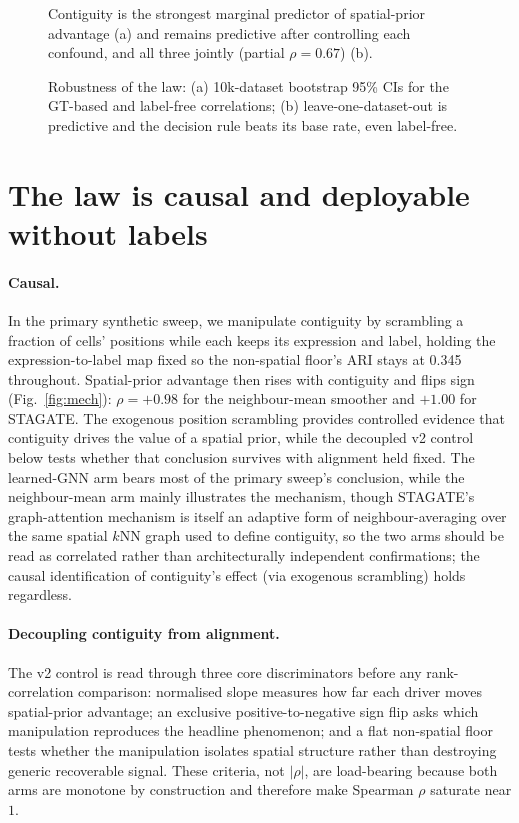 \documentclass[journal]{IEEEtran}
\begin{document}
\begin{figure}[!t]\centering
\resizebox{\linewidth}{!}{}
\caption{Contiguity is the strongest marginal predictor of spatial-prior advantage (a) and remains
predictive after controlling each confound, and all three jointly (partial $\rho=0.67$) (b).}
\label{fig:confound}
\end{figure}

\begin{figure}[!t]\centering
\resizebox{\linewidth}{!}{}
\caption{Robustness of the law: (a) 10k-dataset bootstrap 95\% CIs for the GT-based and label-free
correlations; (b) leave-one-dataset-out is predictive and the decision rule beats its base rate, even
label-free.}
\label{fig:robust}
\end{figure}

\section{The law is causal and deployable without labels}\label{sec:causal}
\paragraph{Causal.} In the primary synthetic sweep, we manipulate contiguity by scrambling a fraction of cells'
positions while each keeps its expression and label, holding the expression-to-label map fixed so the
non-spatial floor's ARI stays at 0.345 throughout. Spatial-prior advantage then rises with contiguity and
flips sign (Fig.~\ref{fig:mech}): $\rho=+0.98$ for the neighbour-mean smoother and $+1.00$ for STAGATE.
The exogenous position scrambling provides controlled evidence that contiguity drives the value
of a spatial prior, while the decoupled v2 control below tests whether that conclusion survives with
alignment held fixed. The learned-GNN arm bears most of the primary sweep's conclusion, while the neighbour-mean arm mainly
illustrates the mechanism, though STAGATE's graph-attention mechanism is itself an adaptive form of
neighbour-averaging over the same spatial $k$NN graph used to define contiguity, so the two arms should be
read as correlated rather than architecturally independent confirmations; the causal identification of
contiguity's effect (via exogenous scrambling) holds regardless.

\paragraph{Decoupling contiguity from alignment.} The v2 control is read through three core discriminators
before any rank-correlation comparison: normalised slope measures how far each driver moves
spatial-prior advantage; an exclusive positive-to-negative sign flip asks which manipulation reproduces the
headline phenomenon; and a flat non-spatial floor tests whether the manipulation isolates spatial structure
rather than destroying generic recoverable signal. These criteria, not $|\rho|$, are load-bearing because
both arms are monotone by construction and therefore make Spearman $\rho$ saturate near $1$.
\end{document}
